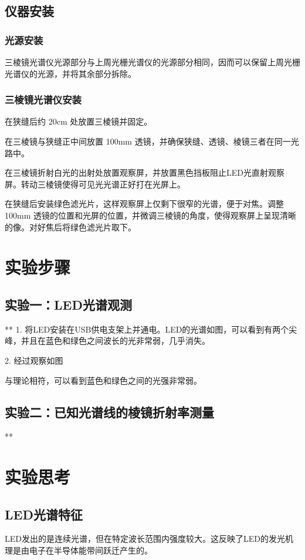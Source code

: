 \documentclass{ctexart}
\begin{document}
\subsection{仪器安装}
\subsubsection{光源安装}
三棱镜光谱仪光源部分与上周光栅光谱仪的光源部分相同，因而可以保留上周光栅光谱仪的光源，并将其余部分拆除。

\subsubsection{三棱镜光谱仪安装}
在狭缝后约 20cm 处放置三棱镜并固定。

在三棱镜与狭缝正中间放置 100mm 透镜，并确保狭缝、透镜、棱镜三者在同一光路中。

在三棱镜折射白光的出射处放置观察屏，并放置黑色挡板阻止LED光直射观察屏。转动三棱镜使得可见光光谱正好打在光屏上。

在狭缝后安装绿色滤光片，这样观察屏上仅剩下很窄的光谱，便于对焦。调整 100mm 透镜的位置和光屏的位置，并微调三棱镜的角度，使得观察屏上呈现清晰的像。对好焦后将绿色滤光片取下。
\section{实验步骤}

\subsection{实验一：LED光谱观测}
**
1. 将LED安装在USB供电支架上并通电。LED的光谱如图，可以看到有两个尖峰，并且在蓝色和绿色之间波长的光非常弱，几乎消失。


2. 经过观察如图

与理论相符，可以看到蓝色和绿色之间的光强非常弱。

\subsection{实验二：已知光谱线的棱镜折射率测量}
**

\section{实验思考}

\subsection{LED光谱特征}
LED发出的是连续光谱，但在特定波长范围内强度较大。这反映了LED的发光机理是由电子在半导体能带间跃迁产生的。
\end{document}
